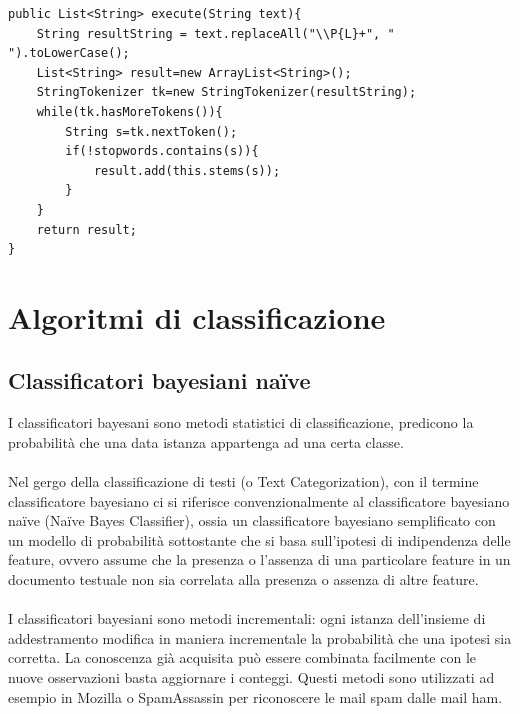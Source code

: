 \documentclass{article}
\theoremstyle{plain}
\theoremstyle{definition}
\begin{document}
\begin{verbatim}
public List<String> execute(String text){
    String resultString = text.replaceAll("\\P{L}+", " ").toLowerCase();
    List<String> result=new ArrayList<String>();
    StringTokenizer tk=new StringTokenizer(resultString);
    while(tk.hasMoreTokens()){
        String s=tk.nextToken(); 
        if(!stopwords.contains(s)){
            result.add(this.stems(s));
        }
    }
    return result;
}
\end{verbatim}


\newpage
\section{Algoritmi di classificazione}

\subsection{Classificatori bayesiani naïve}
I classificatori bayesani sono metodi statistici di classificazione, predicono la probabilità che una data istanza appartenga ad una certa classe.
\\
\\
Nel gergo della classificazione di testi (o Text Categorization), con il termine classificatore bayesiano ci si riferisce convenzionalmente al classificatore bayesiano naïve (Naïve Bayes Classifier), ossia un classificatore bayesiano semplificato con un modello di probabilità sottostante che si basa sull'ipotesi di indipendenza delle feature, ovvero assume che la presenza o l'assenza di una particolare feature in un documento testuale non sia correlata alla presenza o assenza di altre feature.
\\
\\
I classificatori bayesiani sono metodi incrementali: ogni istanza dell'insieme di addestramento modifica in maniera incrementale la probabilità che una ipotesi sia corretta.
La conoscenza già acquisita può essere combinata facilmente con le nuove osservazioni basta aggiornare i conteggi. Questi metodi sono utilizzati ad esempio in Mozilla o SpamAssassin per riconoscere le mail spam dalle mail ham.
\end{document}
